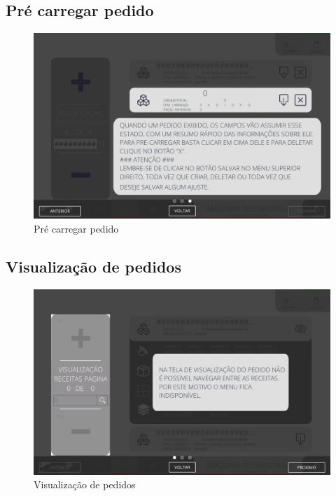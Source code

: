 \thispagestyle{fancy}
\vspace{\fill}
\subsection{\small Pré carregar pedido}
\begin{figure}
    \centering
    \includegraphics[width=576 px,height=360 px]{src/imagesICV/09-request/visualization/e-3.png}
    \caption{Pré carregar pedido}
\end{figure}
\newpage

\thispagestyle{fancy}
\vspace{\fill}
\subsection{\small Visualização de pedidos}
\begin{figure}
    \centering
    \includegraphics[width=576 px,height=360 px]{src/imagesICV/09-request/visualization/e-4.png}
    \caption{Visualização de pedidos}
\end{figure}
\newpage

